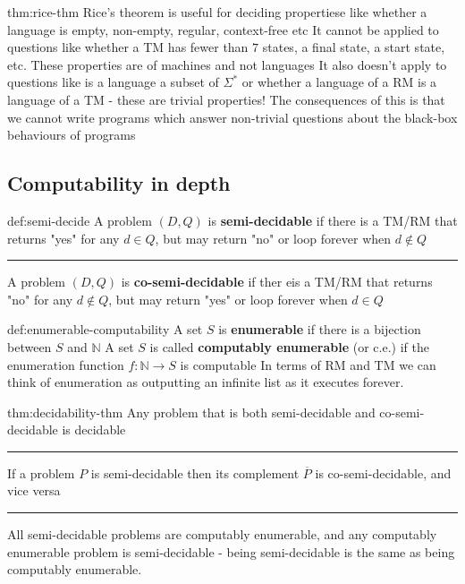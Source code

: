 \documentclass[landscape, 8pt]{extarticle}
\begin{document}
\begin{multicols}{3}
\newpage
\begin{thm}{thm:rice-thm}{}
Rice's theorem is useful for deciding propertiese like whether a language is empty, non-empty, regular, context-free etc\newline
It cannot be applied to questions like whether a TM has fewer than $7$ states, a final state, a start state, etc. These properties are of machines and not languages\newline
It also doesn't apply to questions like is a language a subset of $\Sigma^{*}$ or whether a language of a RM is a language of a TM - these are trivial properties!
The consequences of this is that we cannot write programs which answer non-trivial questions about the black-box behaviours of programs
\end{thm}



\subsection*{Computability in depth}

\begin{dfn}{def:semi-decide}{}
A problem $(D, Q)$ is \textbf{semi-decidable} if there is a TM/RM that returns "yes" for any $d\in Q$, but may return "no" or loop forever when $d\not\in Q$
\newline
\noindent\rule{\textwidth}{0.2pt}
A problem $(D, Q)$ is \textbf{co-semi-decidable} if ther eis a TM/RM that returns "no" for any $d\not\in Q$, but may return "yes" or loop forever when $d\in Q$
\end{dfn}


\begin{dfn}{def:enumerable-computability}{}
A set $S$ is \textbf{enumerable} if there is a bijection between $S$ and $\mathbb{N}$
\newline
A set $S$ is called \textbf{computably enumerable} (or c.e.) if the enumeration function $f : \mathbb{N} \to S$ is computable \newline
In terms of RM and TM we can think of enumeration as outputting an infinite
list as it executes forever.
\end{dfn}


\begin{thm}{thm:decidability-thm}{}
Any problem that is both semi-decidable and co-semi-decidable is decidable
\newline
\noindent\rule{\textwidth}{0.2pt}
If a problem $P$ is semi-decidable then its complement $\overline{P}$ is co-semi-decidable, and vice versa
\newline
\noindent\rule{\textwidth}{0.2pt}
All semi-decidable problems are computably enumerable, and any computably enumerable problem is semi-decidable - being semi-decidable is the same as being computably enumerable.
\end{thm}


\end{multicols}
\end{document}
